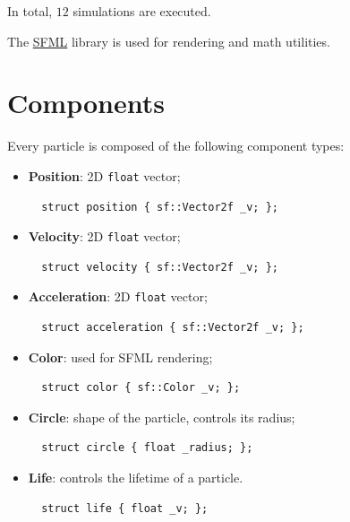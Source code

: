 \documentclass[oneside, 12pt, a4paper, openany]{book}
\begin{document}
In total, \(12\) simulations are executed.

The \href{http://sfml-dev.org}{SFML} library is used for rendering and
math utilities.

\section{Components}\label{components}

Every particle is composed of the following component types:

\begin{itemize}
\item
  \textbf{Position}: 2D
  \texttt{float}
  vector;

  \begin{verbatim}
  struct position { sf::Vector2f _v; };
  \end{verbatim}
\item
  \textbf{Velocity}: 2D
  \texttt{float}
  vector;

  \begin{verbatim}
  struct velocity { sf::Vector2f _v; };
  \end{verbatim}
\item
  \textbf{Acceleration}: 2D
  \texttt{float}
  vector;

  \begin{verbatim}
  struct acceleration { sf::Vector2f _v; };
  \end{verbatim}
\item
  \textbf{Color}: used for SFML rendering;

  \begin{verbatim}
  struct color { sf::Color _v; };
  \end{verbatim}
\item
  \textbf{Circle}: shape of the particle, controls its radius;

  \begin{verbatim}
  struct circle { float _radius; };
  \end{verbatim}
\item
  \textbf{Life}: controls the lifetime of a particle.

  \begin{verbatim}
  struct life { float _v; };
  \end{verbatim}
\end{itemize}
\end{document}
